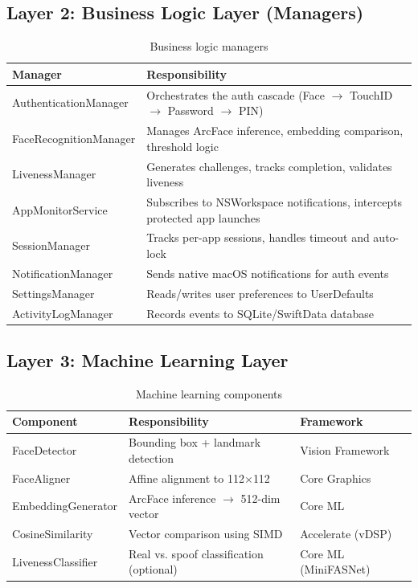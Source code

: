 \documentclass[12pt,a4paper]{report}
\begin{document}
\subsection{Layer 2: Business Logic Layer (Managers)}
\begin{table}[H]
\centering
\begin{tabularx}{\textwidth}{lX}
\toprule
\textbf{Manager} & \textbf{Responsibility} \\
\midrule
AuthenticationManager & Orchestrates the auth cascade (Face $\to$ TouchID $\to$ Password $\to$ PIN) \\
FaceRecognitionManager & Manages ArcFace inference, embedding comparison, threshold logic \\
LivenessManager & Generates challenges, tracks completion, validates liveness \\
AppMonitorService & Subscribes to NSWorkspace notifications, intercepts protected app launches \\
SessionManager & Tracks per-app sessions, handles timeout and auto-lock \\
NotificationManager & Sends native macOS notifications for auth events \\
SettingsManager & Reads/writes user preferences to UserDefaults \\
ActivityLogManager & Records events to SQLite/SwiftData database \\
\bottomrule
\end{tabularx}
\caption{Business logic managers}
\end{table}

\subsection{Layer 3: Machine Learning Layer}
\begin{table}[H]
\centering
\begin{tabularx}{\textwidth}{lXl}
\toprule
\textbf{Component} & \textbf{Responsibility} & \textbf{Framework} \\
\midrule
FaceDetector & Bounding box + landmark detection & Vision Framework \\
FaceAligner & Affine alignment to 112$\times$112 & Core Graphics \\
EmbeddingGenerator & ArcFace inference $\to$ 512-dim vector & Core ML \\
CosineSimilarity & Vector comparison using SIMD & Accelerate (vDSP) \\
LivenessClassifier & Real vs. spoof classification (optional) & Core ML (MiniFASNet) \\
\bottomrule
\end{tabularx}
\caption{Machine learning components}
\end{table}
\end{document}

